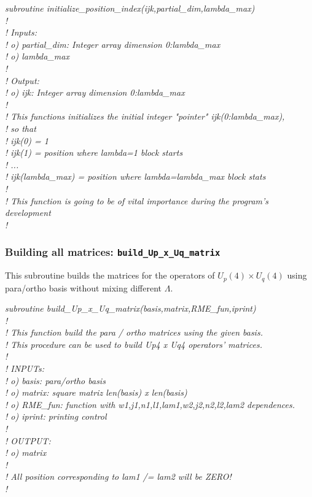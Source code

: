 \documentclass[english,twoside, openright]{report}
\begin{document}
\vbox{\em
  subroutine initialize\_position\_index(ijk,partial\_dim,lambda\_max) \\
    !\\
    ! Inputs:\\
    !        o) partial\_dim: Integer array dimension 0:lambda\_max\\
    !        o) lambda\_max\\
    !\\
    ! Output:\\
    !        o) ijk: Integer array dimension 0:lambda\_max\\
    !\\
    ! This functions initializes the initial integer "pointer" ijk(0:lambda\_max),\\
    ! so that\\
    ! ijk(0) = 1\\
    ! ijk(1) = position where lambda=1 block starts\\
    ! ...\\
    ! ijk(lambda\_max) = position where lambda=lambda\_max block stats\\
    !\\
    ! This function is going to be of vital importance during the program's development\\
    !\\
  }

  \subsubsection{Building all matrices: \texttt{build\_Up\_x\_Uq\_matrix}}

  This subroutine builds the matrices for the operators of $U_p(4)\times U_q(4)$ using
  para/ortho basis without mixing different $\Lambda$.

  
  \vbox{\em
    subroutine build\_Up\_x\_Uq\_matrix(basis,matrix,RME\_fun,iprint)\\
    ! \\
    ! This function build the para / ortho matrices using the given basis. \\
    ! This procedure can be used to build Up4 x Uq4 operators' matrices.\\
    !\\
    ! INPUTs:\\
    !        o) basis:   para/ortho basis\\
    !        o) matrix:  square matriz len(basis) x len(basis)\\
    !        o) RME\_fun: function with w1,j1,n1,l1,lam1,w2,j2,n2,l2,lam2 dependences.\\
    !        o) iprint:  printing control\\
    !\\
    ! OUTPUT:\\
    !        o) matrix\\
    !\\
    ! All position corresponding to lam1 /= lam2 will be ZERO! \\
    !\\
  }
\end{document}
